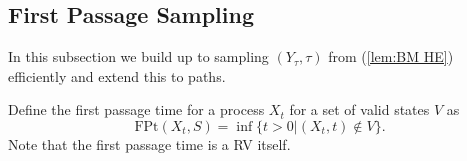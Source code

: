 \documentclass[a4paper,12pt]{article}
\begin{document}

\subsection{First Passage Sampling}
In this subsection we build up to sampling $(Y_{\tau},\tau)$
from (\ref{lem:BM HE}) efficiently and extend this to paths.

\begin{definition} \label{def:first passage time}
    Define the first passage time for a process $X_{t}$ for a set of valid states
    $V$ as
    \begin{equation}
        \text{FPt}(X_{t},S)=\inf \{t>0| (X_{t},t) \notin V \}
        .
    \end{equation}
    Note that the first passage time is a RV itself.
\end{definition}
\end{document}
